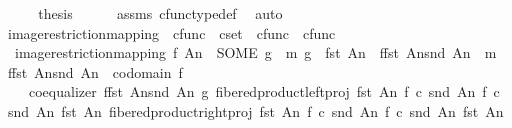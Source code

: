 \begin{isabellebody}
\ \ \isamarkupfalse%
\ \isamarkupfalse%
\ {\isacharquery}{\kern0pt}thesis\isanewline
\ \ \ \ \isamarkupfalse%
\ assms{\isacharparenleft}{\kern0pt}{}{\isacharparenright}{\kern0pt}\ cfunc{\isacharunderscore}{\kern0pt}type{\isacharunderscore}{\kern0pt}def\ \isamarkupfalse%
\ auto\isanewline
{}\isamarkupfalse%
%
\endisatagproof
{\isafoldproof}%
%
\isadelimproof
\isanewline
%
\endisadelimproof
\isanewline
{}\isamarkupfalse%
\ image{\isacharunderscore}{\kern0pt}restriction{\isacharunderscore}{\kern0pt}mapping\ {\isacharcolon}{\kern0pt}{\isacharcolon}{\kern0pt}\ {\isachardoublequoteopen}cfunc\ {\isasymRightarrow}\ cset\ {\isasymtimes}\ cfunc\ {\isasymRightarrow}\ cfunc{\isachardoublequoteclose}\ {\isacharparenleft}{\kern0pt}{\isachardoublequoteopen}{\isacharunderscore}{\kern0pt}{\isasymrestriction}\isactrlbsub {\isacharunderscore}{\kern0pt}\isactrlesub {\isachardoublequoteclose}\ {\isacharbrackleft}{\kern0pt}{}{}{}{\isacharcomma}{\kern0pt}{}{\isacharbrackright}{\kern0pt}{}{}{}{\isacharparenright}{\kern0pt}\ \isanewline
\ \ {\isachardoublequoteopen}image{\isacharunderscore}{\kern0pt}restriction{\isacharunderscore}{\kern0pt}mapping\ f\ An\ {\isacharequal}{\kern0pt}\ {\isacharparenleft}{\kern0pt}SOME\ g{\isachardot}{\kern0pt}\ {\isasymexists}\ m{\isachardot}{\kern0pt}\ g\ {\isacharcolon}{\kern0pt}\ fst\ An\ {\isasymrightarrow}\ f{\isasymlparr}fst\ An{\isasymrparr}\isactrlbsub snd\ An\isactrlesub \ {\isasymand}\ m\ {\isacharcolon}{\kern0pt}\ f{\isasymlparr}fst\ An{\isasymrparr}\isactrlbsub snd\ An\isactrlesub \ {\isasymrightarrow}\ codomain\ f\ {\isasymand}\isanewline
\ \ \ \ coequalizer\ {\isacharparenleft}{\kern0pt}f{\isasymlparr}fst\ An{\isasymrparr}\isactrlbsub snd\ An\isactrlesub {\isacharparenright}{\kern0pt}\ g\ {\isacharparenleft}{\kern0pt}fibered{\isacharunderscore}{\kern0pt}product{\isacharunderscore}{\kern0pt}left{\isacharunderscore}{\kern0pt}proj\ {\isacharparenleft}{\kern0pt}fst\ An{\isacharparenright}{\kern0pt}\ {\isacharparenleft}{\kern0pt}f\ {\isasymcirc}\isactrlsub c\ snd\ An{\isacharparenright}{\kern0pt}\ {\isacharparenleft}{\kern0pt}f\ {\isasymcirc}\isactrlsub c\ snd\ An{\isacharparenright}{\kern0pt}\ {\isacharparenleft}{\kern0pt}fst\ An{\isacharparenright}{\kern0pt}{\isacharparenright}{\kern0pt}\ {\isacharparenleft}{\kern0pt}fibered{\isacharunderscore}{\kern0pt}product{\isacharunderscore}{\kern0pt}right{\isacharunderscore}{\kern0pt}proj\ {\isacharparenleft}{\kern0pt}fst\ An{\isacharparenright}{\kern0pt}\ {\isacharparenleft}{\kern0pt}f\ {\isasymcirc}\isactrlsub c\ snd\ An{\isacharparenright}{\kern0pt}\ {\isacharparenleft}{\kern0pt}f\ {\isasymcirc}\isactrlsub c\ snd\ An{\isacharparenright}{\kern0pt}\ {\isacharparenleft}{\kern0pt}fst\ An{\isacharparenright}{\kern0pt}{\isacharparenright}{\kern0pt}\ {\isasymand}\isanewline

\end{isabellebody}
